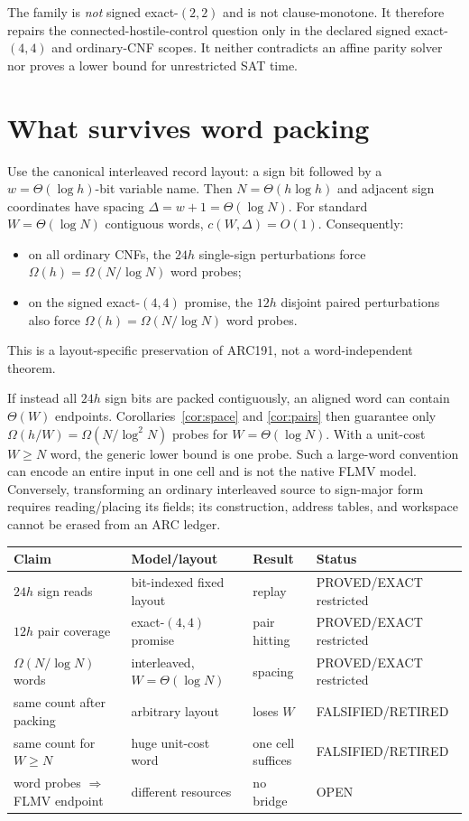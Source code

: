 \documentclass[11pt]{article}
\begin{document}
The family is \emph{not} signed exact-$(2,2)$ and is not clause-monotone.
It therefore repairs the connected-hostile-control question only in the
declared signed exact-$(4,4)$ and ordinary-CNF scopes.  It neither contradicts
an affine parity solver nor proves a lower bound for unrestricted SAT time.

\section{What survives word packing}
Use the canonical interleaved record layout: a sign bit followed by a
$w=\Theta(\log h)$-bit variable name.  Then $N=\Theta(h\log h)$ and adjacent
sign coordinates have spacing $\Delta=w+1=\Theta(\log N)$.  For standard
$W=\Theta(\log N)$ contiguous words, $c(W,\Delta)=O(1)$.  Consequently:
\begin{itemize}
\item on all ordinary CNFs, the $24h$ single-sign perturbations force
$\Omega(h)=\Omega(N/\log N)$ word probes;
\item on the signed exact-$(4,4)$ promise, the $12h$ disjoint paired
perturbations also force $\Omega(h)=\Omega(N/\log N)$ word probes.
\end{itemize}
This is a layout-specific preservation of ARC191, not a word-independent
theorem.

If instead all $24h$ sign bits are packed contiguously, an aligned word can
contain $\Theta(W)$ endpoints.  Corollaries~\ref{cor:space} and
\ref{cor:pairs} then guarantee only
$\Omega(h/W)=\Omega(N/\log^2N)$ probes for $W=\Theta(\log N)$.  With a
unit-cost $W\ge N$ word, the generic lower bound is one probe.  Such a
large-word convention can encode an entire input in one cell and is not the
native FLMV model.  Conversely, transforming an ordinary interleaved source
to sign-major form requires reading/placing its fields; its construction,
address tables, and workspace cannot be erased from an ARC ledger.

\begin{center}\small
\begin{tabular}{llll}
\toprule
Claim & Model/layout & Result & Status\\
\midrule
$24h$ sign reads & bit-indexed fixed layout & replay & PROVED/EXACT restricted\\
$12h$ pair coverage & exact-$(4,4)$ promise & pair hitting & PROVED/EXACT restricted\\
$\Omega(N/\log N)$ words & interleaved, $W=\Theta(\log N)$ & spacing & PROVED/EXACT restricted\\
same count after packing & arbitrary layout & loses $W$ & FALSIFIED/RETIRED\\
same count for $W\ge N$ & huge unit-cost word & one cell suffices & FALSIFIED/RETIRED\\
word probes $\Rightarrow$ FLMV endpoint & different resources & no bridge & OPEN\\
\bottomrule
\end{tabular}
\end{center}
\end{document}
